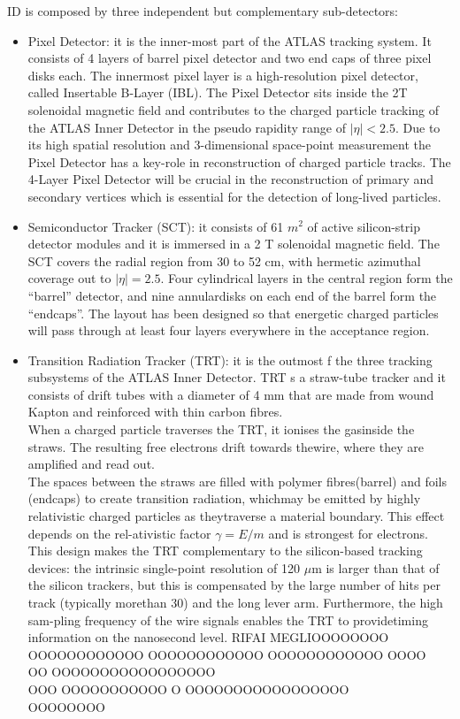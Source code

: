 \documentclass[a4paper, oneside]{book}
\begin{document}
			ID is composed by three independent but complementary sub-detectors: 
			\begin{itemize}
				\item  Pixel Detector:  \cite{Inner Detector}
				it is  the  inner-most  part  of  the  ATLAS  tracking  system. It consists of 4 layers of barrel pixel detector and two end caps of three pixel disks each. The innermost pixel layer is a high-resolution pixel detector,  called Insertable B-Layer (IBL). The Pixel Detector sits inside the 2T solenoidal magnetic field and contributes to the charged particle tracking of the ATLAS Inner Detector in the pseudo rapidity range of $|\eta|<2.5$. Due to its high spatial resolution and 3-dimensional space-point measurement the Pixel Detector has a key-role in reconstruction of charged particle tracks.  The 4-Layer Pixel Detector will be crucial in the reconstruction of primary and secondary vertices which is essential for the detection of long-lived particles.
				\item Semiconductor Tracker (SCT): \cite{SCT}
				it consists of 61 $m^2$ of active silicon-strip detector modules and it is immersed in a 2 T solenoidal magnetic field. The  SCT  covers  the  radial  region  from  30  to  52  cm,  with  hermetic  azimuthal  coverage  out  to $|\eta|=2.5$. Four cylindrical layers in the central region form the “barrel” detector, and nine annulardisks on each end of the barrel form the “endcaps”. The layout has been designed so that energetic charged particles will pass through at least four layers everywhere in the acceptance region.
				\item Transition Radiation Tracker (TRT): \cite{TRT}
				it is the outmost f the three tracking subsystems of the ATLAS Inner Detector. TRT s  a  straw-tube  tracker and it  consists  of  drift  tubes with a diameter of 4 mm that are made from wound Kapton and reinforced with thin carbon fibres. \\
				When a charged particle traverses the TRT, it ionises the gasinside the straws. The resulting free electrons drift towards thewire, where they are amplified and read out. \\
				The spaces between the straws are filled with polymer fibres(barrel) and foils (endcaps) to create transition radiation, whichmay be emitted by highly relativistic charged particles as theytraverse a material boundary.   This effect depends on the rel-ativistic factor $\gamma=E/m$ and is strongest for electrons.
				This design  makes the TRT complementary to  the silicon-based tracking devices:  the intrinsic single-point resolution of 120 $\mu$m is larger than that of the silicon trackers, but this is compensated by the large number of hits per track (typically morethan 30) and the long lever arm.  Furthermore, the high sam-pling frequency of the wire signals enables the TRT to providetiming information on the nanosecond level.
				RIFAI MEGLIOOOOOOOO OOOOOOOOOOOO OOOOOOOOOOOO OOOOOOOOOOOO  OOOO\\OO OOOOOOOOOOOOOOOOO\\OOO OOOOOOOOOOO O  OOOOOOOOOOOOOOOOO\\OOOOOOOO
			\end{itemize}
\end{document}
